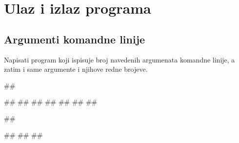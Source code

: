 \chapter{Ulaz i izlaz programa}

\section{Argumenti komandne linije}
 
\begin{Exercise}[label=v2.2_04] 
    Napisati program koji ispisuje broj navedenih argumenata komandne linije,
    a zatim i same argumente i njihove redne brojeve.
    
\begin{miditest}
\begin{upotreba}{1}
##

#\naslovIzlaz#
##
##
##
##
##
##
\end{upotreba}
\end{miditest}
\begin{miditest}
\begin{upotreba}{2}
##

#\naslovIzlaz#
##
##
\end{upotreba}
\end{miditest}

\end{Exercise}
\ifresenja
\begin{Answer}[ref=v2.2_04]
\end{Answer}
 \fi


